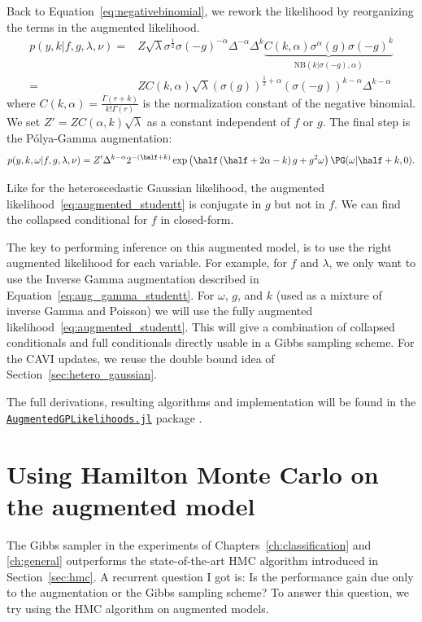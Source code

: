 Back to Equation~\eqref{eq:negativebinomial}, we rework the likelihood by reorganizing the terms in the augmented likelihood.
\begin{align*}
    p(y,k|f,g,\lambda,\nu) =& Z\sqrt{\lambda}\sigma^{\frac{1}{2}}\sigma(-g)^{-\alpha}\Delta^{-\alpha}\Delta^k\underbrace{C(k,\alpha)\sigma^{\alpha}(g)\sigma(-g)^k}_{\mathrm{NB}(k|\sigma(-g),\alpha)}\\
    =& ZC(k,\alpha)\sqrt{\lambda}(\sigma(g))^{\frac{1}{2}+\alpha}(\sigma(-g))^{k-\alpha}\Delta^{k-\alpha}
\end{align*}
where $C(k, \alpha) = \frac{\Gamma(r + k)}{k!\Gamma(r)}$ is the normalization constant of the negative binomial.
We set $Z'=ZC(\alpha,k)\sqrt{\lambda}$ as a constant independent of $f$ or $g$.
The final step is the P\'olya-Gamma augmentation:
\begin{align}
    p(y,k,\omega|f,g,\lambda,\nu) = Z'\Delta^{k-\alpha}2^{-(\half+k)}\exp\left(\half\left(\half + 2\alpha - k\right)g + g^2\omega\right)\PG(\omega|\half+k,0)\label{eq:augmented_studentt}.
\end{align}

Like for the heteroscedastic Gaussian likelihood, the augmented likelihood~\eqref{eq:augmented_studentt} is conjugate in $g$ but not in $f$.
We can find the collapsed conditional for $f$ in closed-form.

The key to performing inference on this augmented model, is to use the right augmented likelihood for each variable.
For example, for $f$ and $\lambda$, we only want to use the Inverse Gamma augmentation described in Equation~\eqref{eq:aug_gamma_studentt}.
For $\omega$, $g$, and $k$ (used as a mixture of inverse Gamma and Poisson) we will use the fully augmented likelihood~\eqref{eq:augmented_studentt}.
This will give a combination of collapsed conditionals and full conditionals directly usable in a Gibbs sampling scheme.
For the \ac{CAVI} updates, we reuse the double bound idea of Section~\ref{sec:hetero_gaussian}.

The full derivations, resulting algorithms and implementation will be found in the \href{https://github.com/JuliaGaussianProcesses/AugmentedGPLikelihoods.jl}{\texttt{AugmentedGPLikelihoods.jl}} package \cite{theo_galy_fajou_2022_6347022}.

\section{Using Hamilton Monte Carlo on the augmented model}
\label{sec:hmc_vs_gibbs}
The Gibbs sampler in the experiments of Chapters~\ref{ch:classification} and \ref{ch:general} outperforms the state-of-the-art \ac{HMC} algorithm introduced in Section~\ref{sec:hmc}.
A recurrent question I got is:
Is the performance gain due only to the augmentation or the Gibbs sampling scheme?
To answer this question, we try using the \ac{HMC} algorithm on augmented models.

